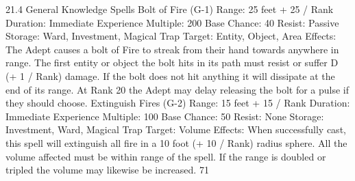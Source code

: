 \documentclass[a4paper]{article}
\begin{document}
\begin{multicols}{3}
21.4 General Knowledge Spells
Bolt of Fire (G-1)
Range: 25 feet + 25 / Rank
Duration: Immediate
Experience Multiple: 200
Base Chance: 40%
Resist: Passive
Storage: Ward, Investment, Magical Trap
Target: Entity, Object, Area
Effects: The Adept causes a bolt of Fire to streak
from their hand towards anywhere in range. The
first entity or object the bolt hits in its path must
resist or suffer D (+ 1 / Rank) damage. If the bolt
does not hit anything it will dissipate at the end of
its range. At Rank 20 the Adept may delay releasing the bolt for a pulse if they should choose.
Extinguish Fires (G-2)
Range: 15 feet + 15 / Rank
Duration: Immediate
Experience Multiple: 100
Base Chance: 50%
Resist: None
Storage: Investment, Ward, Magical Trap
Target: Volume
Effects: When successfully cast, this spell will
extinguish all fire in a 10 foot (+ 10 / Rank) radius
sphere. All the volume affected must be within
range of the spell. If the range is doubled or tripled
the volume may likewise be increased.
71


\end{multicols}
\end{document}
